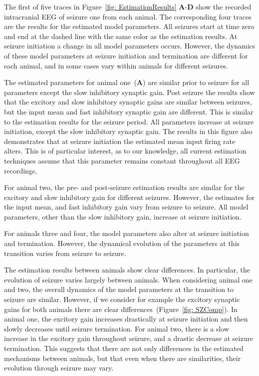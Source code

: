 The first of five traces in Figure~\ref{fig: EstimationResults} \textbf{A}-\textbf{D} show the recorded intracranial EEG of seizure one from each animal. The corresponding four traces are the results for the estimated model parameters. All seizures start at time zero and end at the dashed line with the same color as the estimation results. At seizure initiation a change in all model parameters occurs. However, the dynamics of these model parameters at seizure initiation and termination are different for each animal, and in some cases vary within animals for different seizures. 

The estimated parameters for animal one~(\textbf{A}) are similar prior to seizure for all parameters except the slow inhibitory synaptic gain. Post seizure the results show that the excitory and slow inhibitory synaptic gains are similar between seizures, but the input mean and fast inhibitory synaptic gain are different. This is similar to the estimation results for the seizure period. All parameters increase at seizure initiation, except the slow inhibitory synaptic gain. The results in this figure also demonstrates that at seizure initiation the estimated mean input firing rate alters. This is of particular interest, as to our knowledge, all current estimation techniques assume that this parameter remains constant throughout all EEG recordings. 

For animal two, the pre- and post-seizure estimation results are similar for the excitory and slow inhibitory gain for different seizures. However, the estimates for the input mean, and fast inhibitory gain vary from seizure to seizure. All model parameters, other than the slow inhibitory gain, increase at seizure initiation.  

For animals three and four, the model parameters also alter at seizure initiation and termination. However, the dynamical evolution of the parameters at this transition varies from seizure to seizure.

The estimation results between animals show clear differences. In particular, the evolution of seizure varies largely between animals. When considering animal one and two, the overall dynamics of the model parameters at the transition to seizure are similar. However, if we consider for example the excitory synaptic gains for both animals there are clear differences~(Figure~\ref{fig: SZComp}). In animal one, the excitory gain increases drastically at seizure initiation and then slowly decreases until seizure termination. For animal two, there is a slow increase in the excitory gain throughout seizure, and a drastic decrease at seizure termination. This suggests that there are not only differences in the estimated mechanisms between animals, but that even when there are similarities, their evolution through seizure may vary. 

